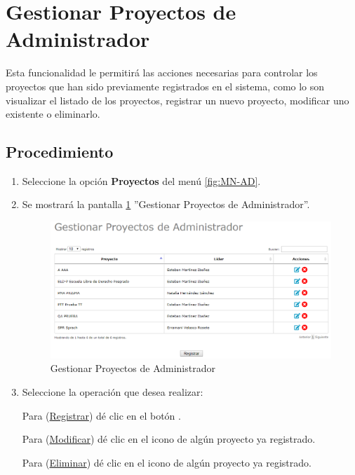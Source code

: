 \hypertarget{cv:GestionarProyectosAdmin}{\section{Gestionar Proyectos de Administrador}} \label{sec:GestionarProyectosAdmin}

	Esta funcionalidad le permitirá las acciones necesarias para controlar los proyectos que han sido previamente registrados en el sistema, como lo son visualizar el listado de los proyectos, registrar un nuevo proyecto, modificar uno existente o eliminarlo.

		\subsection{Procedimiento}

			\begin{enumerate}
	
			\item Seleccione la opción \textbf{Proyectos} del menú \ref{fig:MN-AD}.
	
			\item Se mostrará la pantalla \ref{fig:GestionarProyectosAdmin} ''Gestionar Proyectos de Administrador''.

			\begin{figure}[htbp!]
				\begin{center}
					\includegraphics[scale=0.6]{roles/administrador/proyectosAdmin/gestionarproyectosAdmin/pantallas/IU2GestionProyectos}
					\caption{Gestionar Proyectos de Administrador}
					\label{fig:GestionarProyectosAdmin}
				\end{center}
			\end{figure}
		
				\item Seleccione la operación que desea realizar:
			
			Para (\hyperlink{cv:registrarProyectoAdmin}{Registrar}) dé clic en el botón \IURegistrar.
			
			Para (\hyperlink{cv:modificarProyecto}{Modificar}) dé clic en el icono \IUEditar{} de algún proyecto ya registrado.
			
			Para (\hyperlink{cv:eliminarProyecto}{Eliminar}) dé clic en el icono \IUBotonEliminar{} de algún proyecto ya registrado.
			
			
			\end{enumerate}